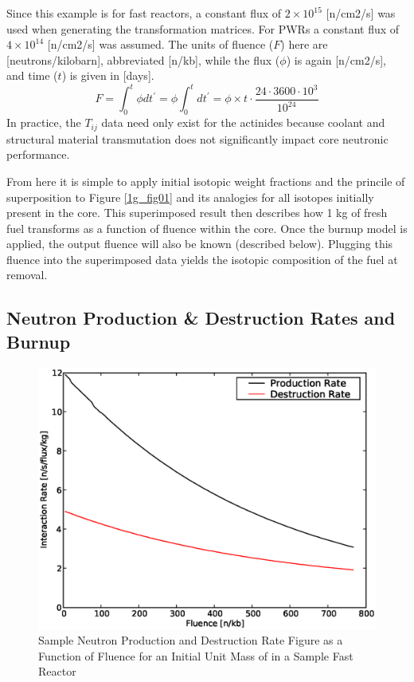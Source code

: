 Since this example is for fast reactors, a constant flux of $2\times10^{15}$ [n/cm2/s] was used 
when generating the transformation matrices.  For PWRs a constant flux of $4\times10^{14}$ [n/cm2/s] 
was assumed.  The units of fluence ($F$) here are [neutrons/kilobarn], abbreviated [n/kb], while the 
flux ($\phi$) is again [n/cm2/s], and time ($t$) is given in [days].
\begin{equation}
\label{fluence}
F = \int_0^t \phi dt^\prime = \phi \int_0^t dt^\prime = \phi \times t \cdot \frac{24 \cdot 3600 \cdot 10^3}{10^{24}}
\end{equation}
In practice, the $T_{ij}$ data need only exist for the actinides because coolant and structural 
material transmutation does not significantly impact core neutronic performance.

From here it is simple to apply initial isotopic weight fractions and the princile of superposition 
to Figure \ref{1g_fig01} and its analogies for all isotopes initially present in the core.  This superimposed result then describes 
how 1 kg of fresh fuel transforms as a function of fluence within the core. Once the burnup model is applied, 
the output fluence will also be known (described below).  Plugging this fluence into the superimposed data 
yields the isotopic composition of the fuel at removal. 



\subsection{Neutron Production \& Destruction Rates and Burnup}
\label{1g_sec:pdbu}

\begin{figure}[htbp]
\caption{Sample Neutron Production and Destruction Rate Figure as a Function of Fluence for an Initial Unit Mass of  in a Sample Fast Reactor}
\label{1g_fig02}
\begin{center}
\includegraphics[scale=0.5]{one_group_method/figs/Fig02.eps}
\end{center}
\end{figure}

